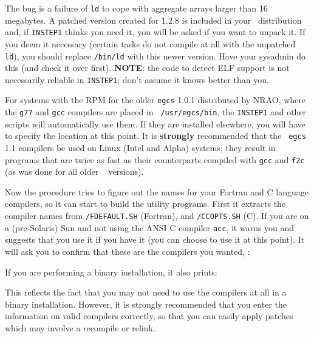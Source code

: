 The bug is a failure of {\tt ld} to cope with aggregate arrays larger
than 16 megabytes.  A patched version created for 1.2.8 is included in
your \AIPS\ distribution and, if {\tt INSTEP1} thinks you need it, you
will be asked if you want to unpack it.  If you deem it necessary
(certain tasks do not compile at all with the unpatched {\tt ld}), you
should replace {\tt /bin/ld} with this newer version.  Have your
sysadmin do this (and check it over first).  {\bf NOTE}: the code to
detect ELF support is not necessarily reliable in {\tt INSTEP1}; don't
assume it knows better than you.

For systems with the RPM for the older {\tt egcs} 1.0.1 distributed by
NRAO, where the {\tt g77} and {\tt gcc} compilers are placed in {\tt
/usr/egcs/bin}, the {\tt INSTEP1} and other scripts will automatically
use them.  If they are installed elsewhere, you will have to specify the
location at this point.  It is {\bf strongly} recommended that the {\tt
egcs} 1.1 compilers be used on Linux (Intel and Alpha) systems; they
result in programs that are twice as fast as their counterparts compiled
with {\tt gcc} and {\tt f2c} (as was done for all older \AIPS\ %
versions).

Now the procedure tries to figure out the names for your Fortran and C
language compilers, so it can start to build the utility programs.
First it extracts the compiler names from {\tt \SYSU/FDEFAULT.SH}
(Fortran), and {\tt \SYSL/CCOPTS.SH} (C).  If you are on a (pre-Solaris)
Sun and not using the ANSI C compiler {\tt acc}, it warns you and
suggests that you use it if you have it (you can choose to use it at
this point).  It will ask you to confirm that these are the compilers
you wanted, \eg:\medskip
\vfill\eject %

\medskip

\noindent If you are performing a binary installation, it also prints:
\medskip

\medskip

\noindent This reflects the fact that you may not need to use the
compilers at all in a binary installation.  However, it is strongly
recommended that you enter the information on valid compilers correctly,
so that you can easily apply patches which may involve a recompile or
relink.

